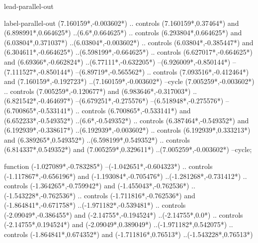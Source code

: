 {\begin{scope}[x=1mm,y=1mm,line width=\SCstroke mm,line cap=round,line join=round]
\begin{SCpart}{lead-parallel-out}
\end{SCpart}
\begin{SCpart}{label-parallel-out}
 ({7.160159*\SCF},{-0.003602*\SCF})
.. controls ({7.160159*\SCF},{0.37464*\SCF}) and ({6.898991*\SCF},{0.664625*\SCF}) ..({6.6*\SCF},{0.664625*\SCF})
.. controls ({6.293804*\SCF},{0.664625*\SCF}) and ({6.03804*\SCF},{0.371037*\SCF}) ..({6.03804*\SCF},{-0.003602*\SCF})
.. controls ({6.03804*\SCF},{-0.385447*\SCF}) and ({6.304611*\SCF},{-0.664625*\SCF}) ..({6.598199*\SCF},{-0.664625*\SCF})
.. controls ({6.627017*\SCF},{-0.664625*\SCF}) and ({6.69366*\SCF},{-0.662824*\SCF}) ..({6.77111*\SCF},{-0.632205*\SCF})
--({6.926009*\SCF},{-0.850144*\SCF})
--({7.111527*\SCF},{-0.850144*\SCF})
--({6.89719*\SCF},{-0.565562*\SCF})
.. controls ({7.093516*\SCF},{-0.412464*\SCF}) and ({7.160159*\SCF},{-0.192723*\SCF}) ..({7.160159*\SCF},{-0.003602*\SCF})
--cycle
({7.005259*\SCF},{-0.003602*\SCF})
.. controls ({7.005259*\SCF},{-0.120677*\SCF}) and ({6.983646*\SCF},{-0.317003*\SCF}) ..({6.821542*\SCF},{-0.464697*\SCF})
--({6.679251*\SCF},{-0.275576*\SCF})
--({6.518948*\SCF},{-0.275576*\SCF})
--({6.700865*\SCF},{-0.533141*\SCF})
.. controls ({6.700865*\SCF},{-0.533141*\SCF}) and ({6.652233*\SCF},{-0.549352*\SCF}) ..({6.6*\SCF},{-0.549352*\SCF})
.. controls ({6.387464*\SCF},{-0.549352*\SCF}) and ({6.192939*\SCF},{-0.338617*\SCF}) ..({6.192939*\SCF},{-0.003602*\SCF})
.. controls ({6.192939*\SCF},{0.333213*\SCF}) and ({6.389265*\SCF},{0.549352*\SCF}) ..({6.598199*\SCF},{0.549352*\SCF})
.. controls ({6.814337*\SCF},{0.549352*\SCF}) and ({7.005259*\SCF},{0.329611*\SCF}) ..({7.005259*\SCF},{-0.003602*\SCF})
--cycle;
\end{SCpart}
\begin{SCpart}{function}
 ({-1.027089*\SCF},{-0.783285*\SCF})
--({-1.042651*\SCF},{-0.604323*\SCF})
.. controls ({-1.117867*\SCF},{-0.656196*\SCF}) and ({-1.193084*\SCF},{-0.705476*\SCF}) ..({-1.281268*\SCF},{-0.731412*\SCF})
.. controls ({-1.364265*\SCF},{-0.759942*\SCF}) and ({-1.455043*\SCF},{-0.762536*\SCF}) ..({-1.543228*\SCF},{-0.762536*\SCF})
.. controls ({-1.711816*\SCF},{-0.762536*\SCF}) and ({-1.864841*\SCF},{-0.671758*\SCF}) ..({-1.971182*\SCF},{-0.539481*\SCF})
.. controls ({-2.09049*\SCF},{-0.386455*\SCF}) and ({-2.14755*\SCF},{-0.194524*\SCF}) ..({-2.14755*\SCF},{0.0*\SCF})
.. controls ({-2.14755*\SCF},{0.194524*\SCF}) and ({-2.09049*\SCF},{0.389049*\SCF}) ..({-1.971182*\SCF},{0.542075*\SCF})
.. controls ({-1.864841*\SCF},{0.674352*\SCF}) and ({-1.711816*\SCF},{0.76513*\SCF}) ..({-1.543228*\SCF},{0.76513*\SCF})

\end{SCpart}
\end{scope}}
